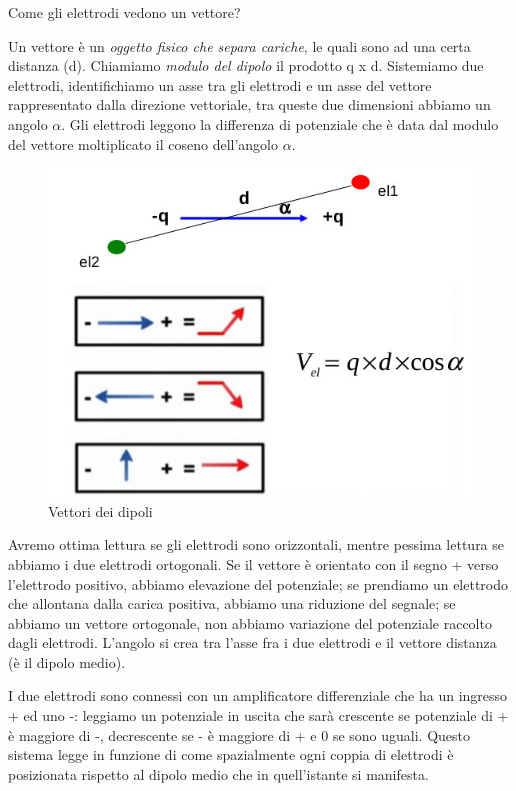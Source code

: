 \documentclass[a4paper,12pt]{article}
\begin{document}
Come gli elettrodi vedono un vettore? 

Un vettore è un \emph{oggetto fisico che separa cariche}, le quali sono ad una certa distanza (d). Chiamiamo \emph{modulo del dipolo} il prodotto q x d. Sistemiamo due elettrodi, identifichiamo un asse tra gli elettrodi e un asse del vettore rappresentato dalla direzione vettoriale, tra queste due dimensioni abbiamo un angolo $\alpha$. Gli elettrodi leggono la differenza di potenziale che è data dal modulo del vettore moltiplicato il coseno dell'angolo $\alpha$. 
\begin{figure}[H]
\centering
\includegraphics[scale=0.4]{immagine/vettori.jpg}
\caption{Vettori dei dipoli}
\end{figure}
Avremo ottima lettura se gli elettrodi sono orizzontali, mentre pessima lettura se abbiamo i due elettrodi ortogonali. Se il vettore è orientato con il segno + verso l'elettrodo positivo, abbiamo  elevazione del potenziale; se prendiamo un elettrodo che allontana dalla carica positiva, abbiamo una riduzione del segnale; se abbiamo un vettore ortogonale, non abbiamo variazione del potenziale raccolto dagli elettrodi. L'angolo si crea tra l'asse fra i due elettrodi e il vettore distanza (è il dipolo medio).

I due elettrodi sono connessi con un amplificatore differenziale che ha un ingresso + ed uno -: leggiamo un potenziale in uscita che sarà crescente se potenziale di + è maggiore di -, decrescente se - è maggiore di + e 0 se sono uguali. Questo sistema legge in funzione di come spazialmente ogni coppia di elettrodi è posizionata rispetto al dipolo medio che in quell'istante si manifesta.
\end{document}
